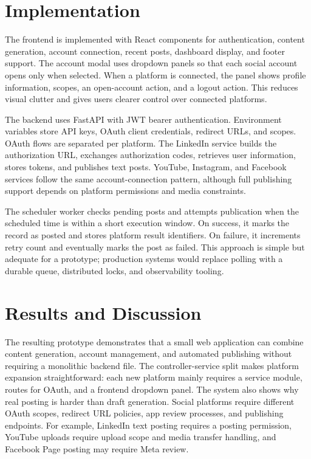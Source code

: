 \documentclass[conference]{IEEEtran}
\begin{document}
\section{Implementation}
The frontend is implemented with React components for authentication, content generation, account connection, recent posts, dashboard display, and footer support. The account modal uses dropdown panels so that each social account opens only when selected. When a platform is connected, the panel shows profile information, scopes, an open-account action, and a logout action. This reduces visual clutter and gives users clearer control over connected platforms.

The backend uses FastAPI with JWT bearer authentication. Environment variables store API keys, OAuth client credentials, redirect URLs, and scopes. OAuth flows are separated per platform. The LinkedIn service builds the authorization URL, exchanges authorization codes, retrieves user information, stores tokens, and publishes text posts. YouTube, Instagram, and Facebook services follow the same account-connection pattern, although full publishing support depends on platform permissions and media constraints.

The scheduler worker checks pending posts and attempts publication when the scheduled time is within a short execution window. On success, it marks the record as posted and stores platform result identifiers. On failure, it increments retry count and eventually marks the post as failed. This approach is simple but adequate for a prototype; production systems would replace polling with a durable queue, distributed locks, and observability tooling.

\section{Results and Discussion}
The resulting prototype demonstrates that a small web application can combine content generation, account management, and automated publishing without requiring a monolithic backend file. The controller-service split makes platform expansion straightforward: each new platform mainly requires a service module, routes for OAuth, and a frontend dropdown panel. The system also shows why real posting is harder than draft generation. Social platforms require different OAuth scopes, redirect URL policies, app review processes, and publishing endpoints. For example, LinkedIn text posting requires a posting permission, YouTube uploads require upload scope and media transfer handling, and Facebook Page posting may require Meta review.
\end{document}
